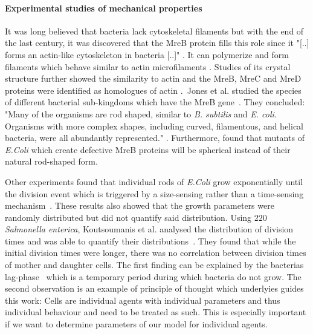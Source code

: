 \documentclass{article}
\begin{document}
\paragraph{Experimental studies of mechanical properties}
It was long believed that bacteria lack cytoskeletal filaments but with the end of the last
century, it was discovered that the MreB protein fills this role since it "[..] forms an actin-like
cytoskeleton in bacteria [..]" \cite{Erickson2001}.
It can polymerize and form filaments which behave similar to actin microfilaments \cite{Dersch2020}.
Studies of its crystal structure further showed the similarity to actin \cite{vandenEnt2001} and the
MreB, MreC and MreD proteins were identified as homologues of actin \cite{Lowe2017_lj}.\
Jones et al. studied the species of different bacterial sub-kingdoms which have the MreB
gene~\cite{Jones2001}.
They concluded: "Many of the organisms are rod shaped, similar to \textit{B. subtilis} and
\textit{E. coli}.
Organisms with more complex shapes, including curved, filamentous, and helical bacteria, were all
abundantly represented." \cite{Jones2001}.
Furthermore, \cite{Wachi1987} found that mutants of \textit{E.Coli} which create defective MreB
proteins will be spherical instead of their natural rod-shaped form.

Other experiments found that individual rods of \textit{E.Coli} grow exponentially until the
division event which is triggered by a size-sensing rather than a time-sensing
mechanism~\cite{Robert2014}.
These results also showed that the growth parameters were randomly distributed but did not quantify
said distribution.
Using $220$ \textit{Salmonella enterica}, Koutsoumanis et al. analysed the distribution of division
times and was able to quantify their distributions~\cite{Koutsoumanis2013}.
They found that while the initial division times were longer, there was no correlation between
division times of mother and daughter cells.
The first finding can be explained by the bacterias lag-phase~\cite{Bertrand2019} which is a
temporary period during which bacteria do not grow.
The second observation is an example of principle of thought which underlyies guides this work:
Cells are individual agents with individual parameters and thus individual behaviour and need to be
treated as such.
This is especially important if we want to determine parameters of our model for individual agents.
\end{document}

